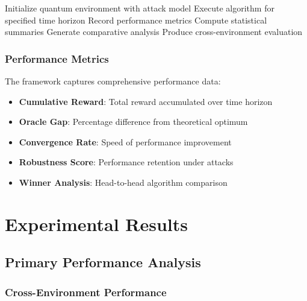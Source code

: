 \documentclass[11pt,a4paper]{article}
\begin{document}
\begin{algorithm}[H]
\caption{Dynamic Environment Evaluation Protocol}
\begin{algorithmic}[1]
                \STATE Initialize quantum environment with attack model
                \STATE Execute algorithm for specified time horizon
                \STATE Record performance metrics
            \ENDFOR
            \STATE Compute statistical summaries
        \ENDFOR
    \ENDFOR
    \STATE Generate comparative analysis
\ENDFOR
\STATE Produce cross-environment evaluation
\end{algorithmic}
\end{algorithm}

\subsubsection{Performance Metrics}

The framework captures comprehensive performance data:

\begin{itemize}
\item \textbf{Cumulative Reward}: Total reward accumulated over time horizon
\item \textbf{Oracle Gap}: Percentage difference from theoretical optimum
\item \textbf{Convergence Rate}: Speed of performance improvement
\item \textbf{Robustness Score}: Performance retention under attacks
\item \textbf{Winner Analysis}: Head-to-head algorithm comparison
\end{itemize}

\section{Experimental Results}

\subsection{Primary Performance Analysis}

\subsubsection{Cross-Environment Performance}
\end{document}
